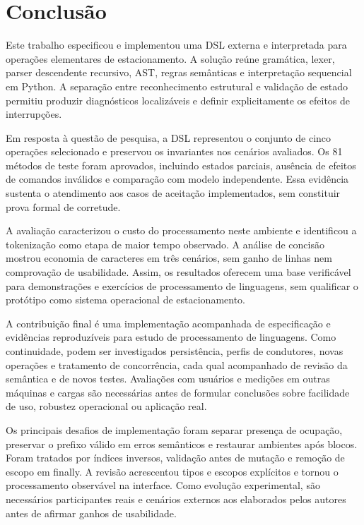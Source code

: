 \documentclass[conference,a4paper]{IEEEtran}
\begin{document}
\section{Conclusão}

Este trabalho especificou e implementou uma DSL externa e interpretada para operações elementares de estacionamento. A solução reúne gramática, lexer, parser descendente recursivo, AST, regras semânticas e interpretação sequencial em Python. A separação entre reconhecimento estrutural e validação de estado permitiu produzir diagnósticos localizáveis e definir explicitamente os efeitos de interrupções.


Em resposta à questão de pesquisa, a DSL representou o conjunto de cinco operações selecionado e preservou os invariantes nos cenários avaliados. Os 81 métodos de teste foram aprovados, incluindo estados parciais, ausência de efeitos de comandos inválidos e comparação com modelo independente. Essa evidência sustenta o atendimento aos casos de aceitação implementados, sem constituir prova formal de corretude.


A avaliação caracterizou o custo do processamento neste ambiente e identificou a tokenização como etapa de maior tempo observado. A análise de concisão mostrou economia de caracteres em três cenários, sem ganho de linhas nem comprovação de usabilidade. Assim, os resultados oferecem uma base verificável para demonstrações e exercícios de processamento de linguagens, sem qualificar o protótipo como sistema operacional de estacionamento.


A contribuição final é uma implementação acompanhada de especificação e evidências reproduzíveis para estudo de processamento de linguagens. Como continuidade, podem ser investigados persistência, perfis de condutores, novas operações e tratamento de concorrência, cada qual acompanhado de revisão da semântica e de novos testes. Avaliações com usuários e medições em outras máquinas e cargas são necessárias antes de formular conclusões sobre facilidade de uso, robustez operacional ou aplicação real.


Os principais desafios de implementação foram separar presença de ocupação, preservar o prefixo válido em erros semânticos e restaurar ambientes após blocos. Foram tratados por índices inversos, validação antes de mutação e remoção de escopo em finally. A revisão acrescentou tipos e escopos explícitos e tornou o processamento observável na interface. Como evolução experimental, são necessários participantes reais e cenários externos aos elaborados pelos autores antes de afirmar ganhos de usabilidade.
\end{document}
